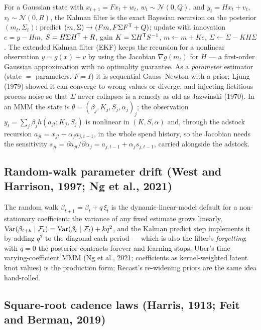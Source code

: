 For a Gaussian state with $x_{t+1} = Fx_t + w_t$, $w_t \sim \mathcal N(0,Q)$, and $y_t = Hx_t + v_t$, $v_t \sim \mathcal N(0,R)$, the Kalman filter is the exact Bayesian recursion on the posterior $(m_t,\Sigma_t)$: predict $(m,\Sigma) \to (Fm, F\Sigma F^{\mathsf{T}} + Q)$; update with innovation $e = y - Hm$, $S = H\Sigma H^{\mathsf{T}} + R$, gain $K = \Sigma H^{\mathsf{T}} S^{-1}$, $m \leftarrow m + Ke$, $\Sigma \leftarrow \Sigma - KH\Sigma$. The extended Kalman filter (EKF) keeps the recursion for a nonlinear observation $y = g(x) + v$ by using the Jacobian $\nabla g(m_t)$ for $H$ --- a first-order Gaussian approximation with no optimality guarantee. As a \emph{parameter} estimator (state $=$ parameters, $F = I$) it is sequential Gauss--Newton with a prior; Ljung (1979) showed it can converge to wrong values or diverge, and injecting fictitious process noise so that $\Sigma$ never collapses is a remedy as old as Jazwinski (1970). In an MMM the state is $\theta = (\beta_j, K_j, S_j, \alpha_j)_j$; the observation $y_t = \sum_j\beta_jh(a_{jt};K_j,S_j)$ is nonlinear in $(K,S,\alpha)$ and, through the adstock recursion $a_{jt} = x_{jt} + \alpha_ja_{j,t-1}$, in the whole spend history, so the Jacobian needs the sensitivity $s_{jt} = \partial a_{jt}/\partial\alpha_j = a_{j,t-1} + \alpha_js_{j,t-1}$, carried alongside the adstock.

\subsection{Random-walk parameter drift (West and Harrison, 1997; Ng et al., 2021)}

The random walk $\beta_{t+1} = \beta_t + q\,\xi_t$ is the dynamic-linear-model default for a non-stationary coefficient: the variance of any fixed estimate grows linearly, $\operatorname{Var}(\beta_{t+k}\mid\mathcal F_t) = \operatorname{Var}(\beta_t\mid\mathcal F_t) + kq^2$, and the Kalman predict step implements it by adding $q^2$ to the diagonal each period --- which is also the filter's \emph{forgetting}; with $q = 0$ the posterior contracts forever and learning stops. Uber's time-varying-coefficient MMM (Ng et al., 2021; coefficients as kernel-weighted latent knot values) is the production form; Recast's re-widening priors are the same idea hand-rolled.

\subsection{Square-root cadence laws (Harris, 1913; Feit and Berman, 2019)}

